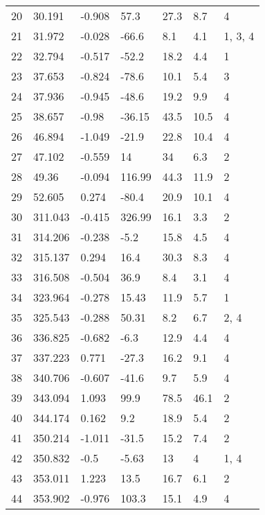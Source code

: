 \begin{longtable}{|l|l|l|l|l|l|l|}
        20 & 30.191 & -0.908 & 57.3 & 27.3 & 8.7 & 4 \\ 
        21 & 31.972 & -0.028 & -66.6 & 8.1 & 4.1 & 1, 3, 4 \\ 
        22 & 32.794 & -0.517 & -52.2 & 18.2 & 4.4 & 1 \\ 
        23 & 37.653 & -0.824 & -78.6 & 10.1 & 5.4 & 3 \\ 
        24 & 37.936 & -0.945 & -48.6 & 19.2 & 9.9 & 4 \\ 
        25 & 38.657 & -0.98 & -36.15 & 43.5 & 10.5 & 4 \\ 
        26 & 46.894 & -1.049 & -21.9 & 22.8 & 10.4 & 4 \\ 
        27 & 47.102 & -0.559 & 14 & 34 & 6.3 & 2 \\ 
        28 & 49.36 & -0.094 & 116.99 & 44.3 & 11.9 & 2 \\ 
        29 & 52.605 & 0.274 & -80.4 & 20.9 & 10.1 & 4 \\ 
        30 & 311.043 & -0.415 & 326.99 & 16.1 & 3.3 & 2 \\ 
        31 & 314.206 & -0.238 & -5.2 & 15.8 & 4.5 & 4 \\ 
        32 & 315.137 & 0.294 & 16.4 & 30.3 & 8.3 & 4 \\ 
        33 & 316.508 & -0.504 & 36.9 & 8.4 & 3.1 & 4 \\ 
        34 & 323.964 & -0.278 & 15.43 & 11.9 & 5.7 & 1 \\ 
        35 & 325.543 & -0.288 & 50.31 & 8.2 & 6.7 & 2, 4 \\ 
        36 & 336.825 & -0.682 & -6.3 & 12.9 & 4.4 & 4 \\ 
        37 & 337.223 & 0.771 & -27.3 & 16.2 & 9.1 & 4 \\ 
        38 & 340.706 & -0.607 & -41.6 & 9.7 & 5.9 & 4 \\ 
        39 & 343.094 & 1.093 & 99.9 & 78.5 & 46.1 & 2 \\ 
        40 & 344.174 & 0.162 & 9.2 & 18.9 & 5.4 & 2 \\ 
        41 & 350.214 & -1.011 & -31.5 & 15.2 & 7.4 & 2 \\ 
        42 & 350.832 & -0.5 & -5.63 & 13 & 4 & 1, 4 \\ 
        43 & 353.011 & 1.223 & 13.5 & 16.7 & 6.1 & 2 \\ 
        44 & 353.902 & -0.976 & 103.3 & 15.1 & 4.9 & 4 \\\hline

\end{longtable}